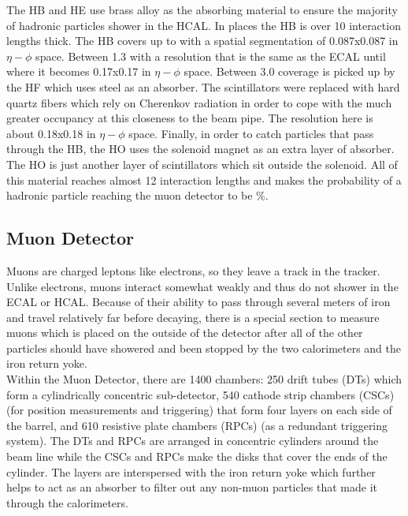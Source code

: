 The HB and HE use brass alloy as the absorbing material to ensure the majority of hadronic particles shower in the HCAL. In places the HB is over 10 interaction lengths thick. The HB covers up to \abseta {} with a spatial segmentation of 0.087x0.087 in $\eta - \phi$ space. Between 1.3 \lt \abseta {} with a resolution that is the same as the ECAL until \abseta {} where it becomes 0.17x0.17 in $\eta - \phi$ space. Between 3.0 \lt \abseta {} coverage is picked up by the HF which uses steel as an absorber. The scintillators were replaced with hard quartz fibers which rely on Cherenkov radiation in order to cope with the much greater occupancy at this closeness to the beam pipe. The resolution here is about 0.18x0.18 in $\eta - \phi$ space. Finally, in order to catch particles that pass through the HB, the HO uses the solenoid magnet as an extra layer of absorber. The HO is just another layer of scintillators which sit outside the solenoid. All of this material reaches almost 12 interaction lengths and makes the probability of a hadronic particle reaching the muon detector to be \%.
	
	\subsection{Muon Detector}
	\label{sec:muon_detector}
	Muons are charged leptons like electrons, so they leave a track in the tracker. Unlike electrons, muons interact somewhat weakly and thus do not shower in the ECAL or HCAL. Because of their ability to pass through several meters of iron and travel relatively far before decaying, there is a special section to measure muons which is placed on the outside of the detector after all of the other particles should have showered and been stopped by the two calorimeters and the iron return yoke. \\
	
	Within the Muon Detector, there are 1400 chambers: 250 drift tubes (DTs) which form a cylindrically concentric sub-detector, 540 cathode strip chambers (CSCs) (for position measurements and triggering) that form four layers on each side of the barrel, and 610 resistive plate chambers (RPCs) (as a redundant triggering system). The DTs and RPCs are arranged in concentric cylinders around the beam line while the CSCs and RPCs make the disks that cover the ends of the cylinder. The layers are interspersed with the iron return yoke which further helps to act as an absorber to filter out any non-muon particles that made it through the calorimeters.\\
	
